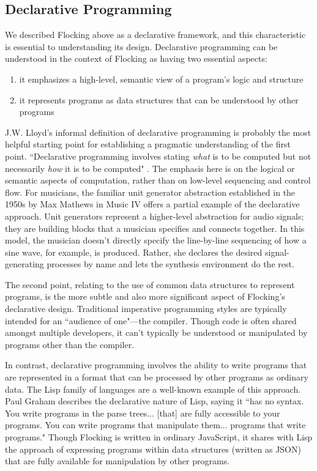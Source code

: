 \documentclass{article}
\begin{document}
\subsection{Declarative Programming}

We described Flocking above as a declarative framework, and this characteristic is essential to understanding its design. Declarative programming can be understood in the context of Flocking as having two essential aspects:

\begin{enumerate}
\item it emphasizes a high-level, semantic view of a program’s logic and structure
\item it represents programs as data structures that can be understood by other programs
\end{enumerate}

J.W. Lloyd's informal definition of declarative programming is probably the most helpful starting point for establishing a pragmatic understanding of the first point. ``Declarative programming involves stating {\it what} is to be computed but not necessarily {\it how} it is to be computed" \cite{lloyd1994practical}. The emphasis here is on the logical or semantic aspects of computation, rather than on low-level sequencing and control flow. For musicians, the familiar unit generator abstraction established in the 1950s by Max Mathews in Music IV \cite{mathews1969technology} offers a partial example of the declarative approach. Unit generators represent a higher-level abstraction for audio signals; they are building blocks that a musician specifies and connects together. In this model, the musician doesn't directly specify the line-by-line sequencing of how a sine wave, for example, is produced. Rather, she declares the desired signal-generating processes by name and lets the synthesis environment do the rest.

The second point, relating to the use of common data structures to represent programs, is the more subtle and also more significant aspect of Flocking’s declarative design. Traditional imperative programming styles are typically intended for an ``audience of one"---the compiler. Though code is often shared amongst multiple developers, it can’t typically be understood or manipulated by programs other than the compiler.

In contrast, declarative programming involves the ability to write programs that are represented in a format that can be processed by other programs as ordinary data. The Lisp family of languages are a well-known example of this approach. Paul Graham describes the declarative nature of Lisp, saying it ``has no syntax. You write programs in the parse trees... [that] are fully accessible to your programs. You can write programs that manipulate them... programs that write programs." Though Flocking is written in ordinary JavaScript, it shares with Lisp the approach of expressing programs within data structures (written as JSON) that are fully available for manipulation by other programs.
\end{document}
